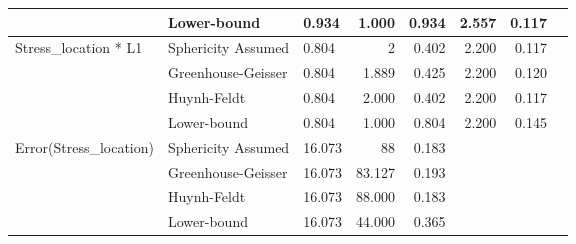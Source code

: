 \documentclass[a4paper]{article}
\begin{document}
\begin{table}[H]
\begin{tabular}{p{}p{}|l|r|r|r|r|r|}
\cline{2-7}
                                                        & Lower-bound        & 0.934                                        & 1.000                   & 0.934                            & 2.557                  & 0.117                      \\ 
\hline
\multirow{4}{*}{Stress\_location * L1}                  & Sphericity Assumed & 0.804                                        & 2                       & 0.402                            & 2.200                  & 0.117                      \\ 
\cline{2-7}
                                                        & Greenhouse-Geisser & 0.804                                        & 1.889                   & 0.425                            & 2.200                  & 0.120                      \\ 
\cline{2-7}
                                                        & Huynh-Feldt        & 0.804                                        & 2.000                   & 0.402                            & 2.200                  & 0.117                      \\ 
\cline{2-7}
                                                        & Lower-bound        & 0.804                                        & 1.000                   & 0.804                            & 2.200                  & 0.145                      \\ 
\hline
\multirow{4}{*}{Error(Stress\_location)}                & Sphericity Assumed & 16.073                                       & 88                      & 0.183                            & \multicolumn{1}{l|}{~} & \multicolumn{1}{l|}{~}     \\ 
\cline{2-7}
                                                        & Greenhouse-Geisser & 16.073                                       & 83.127                  & 0.193                            & \multicolumn{1}{l|}{~} & \multicolumn{1}{l|}{~}     \\ 
\cline{2-7}
                                                        & Huynh-Feldt        & 16.073                                       & 88.000                  & 0.183                            & \multicolumn{1}{l|}{~} & \multicolumn{1}{l|}{~}     \\ 
\cline{2-7}
                                                        & Lower-bound        & 16.073                                       & 44.000                  & 0.365                            & \multicolumn{1}{l|}{~} & \multicolumn{1}{l|}{~}     \\ 

\end{tabular}
\end{table}
\end{document}
